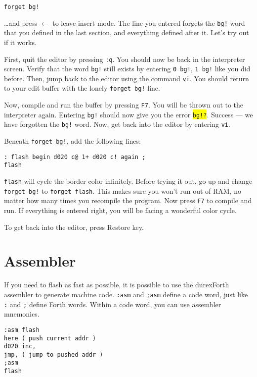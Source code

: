 \begin{verbatim}
forget bg!
\end{verbatim}

\ldots and press $\leftarrow$ to leave insert mode. The line you entered forgets the \texttt{bg!} word that you defined in the last section, and everything defined after it. Let's try out if it works.

First, quit the editor by pressing \texttt{:q}. You should now be back in the interpreter screen.
Verify that the word \texttt{bg!} still exists by  entering \texttt{0 bg!}, \texttt{1 bg!} like you did
before. Then, jump back to the editor using the command \texttt{vi}. You should return to your edit buffer with the lonely \texttt{forget bg!} line.

Now, compile and run the buffer by pressing \texttt{F7}. You will be thrown out to the interpreter
again. Entering \texttt{bg!} should now give you the error \colorbox{yellow}{\texttt{bg!?}}. Success
--- we have forgotten the \texttt{bg!} word. Now, get back into the editor by entering \texttt{vi}.

Beneath \texttt{forget bg!}, add the following lines:

\begin{verbatim}
: flash begin d020 c@ 1+ d020 c! again ;
flash
\end{verbatim}

\texttt{flash} will cycle the border color infinitely. Before trying it out, go up and change \texttt{forget bg!} to \texttt{forget flash}. This makes sure you won't run out of RAM, no matter how many times you recompile the program. Now press \texttt{F7} to compile and run. If everything is entered right, you will be facing a wonderful color cycle.

To get back into the editor, press Restore key. 

\section{Assembler}

If you need to flash as fast as possible, it is possible to use the durexForth assembler to generate machine code. \texttt{:asm} and \texttt{;asm} define a code word, just like \texttt{:} and \texttt{;} define Forth words. Within a code word, you can use assembler mnemonics. 

\begin{verbatim}
:asm flash
here ( push current addr )
d020 inc,
jmp, ( jump to pushed addr )
;asm
flash
\end{verbatim}


